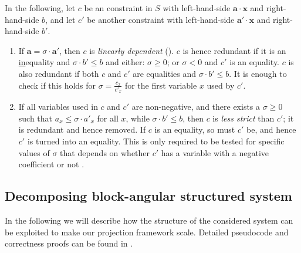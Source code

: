 \documentclass[citeauthoryear]{llncs}
\newcommand{\ve}{\mathbf}
\newcounter{counterName}
\begin{document}
In the following, let $c$ be an constraint in $S$ with left-hand-side $\ve{a}\cdot \ve{x}$ and right-hand-side $b$, and let $c'$ be another constraint with left-hand-side $\ve{a}'\cdot \ve{x}$ and right-hand-side $b'$. 
\begin{enumerate} \itemsep0em
\setcounter{enumi}{\value{counterName}}
\item 
If $\ve{a}=\sigma\cdot \ve{a}'$, then $c$ is \emph{linearly dependent} (\cite{lassez93}). $c$ is hence redundant if
it is an \underline{in}equality and $\sigma\cdot b'\leq b$ and either: $\sigma\geq 0$; or $\sigma<0$ and $c'$ is an equality. $c$ is also redundant if both $c$ and $c'$ are equalities and $\sigma\cdot b'\leq b$. 
It is enough to check if this holds for $\sigma = \frac{c_x}{c'_x}$ for the first variable $x$ used by $c'$.
\item
If all variables used in $c$ and $c'$ are non-negative, and there exists a $\sigma\geq 0$ such that $a_x \leq \sigma \cdot a'_x$ for all $x$, while $\sigma\cdot b' \leq b$, then $c$ is \emph{less strict} than $c'$; it is redundant and hence removed. If $c$ is an equality, so must $c'$ be, and hence $c'$ is turned into an equality. 
This is only required to be tested for specific values of $\sigma$ that depends on whether $c'$ has a variable with a negative coefficient or not \cite{MyTechRep}.
\end{enumerate} 

\subsection{Decomposing block-angular structured system}
\label{sec:decomp}
In the following we will describe how the structure of the considered system can be exploited to make our projection framework scale. Detailed pseudocode and correctness proofs can be found in \cite{MyTechRep}. 
\end{document}
